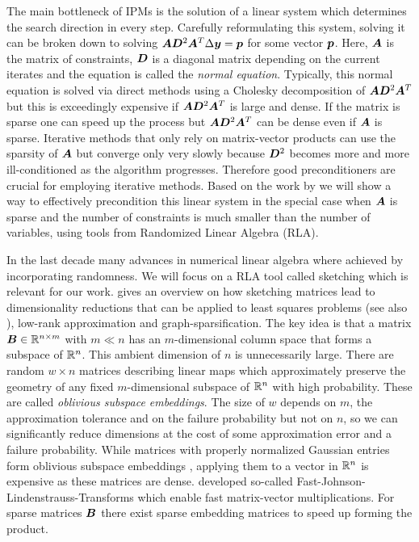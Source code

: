 The main bottleneck of IPMs is the solution of a linear system which determines the search direction in every step.
Carefully reformulating this system, solving it can be broken down to solving \(\bm{A} \bm{D}^2 \bm{A}^T \Delta \bm{y} = \bm{p}\) for some vector \(\bm{p}\).
Here, \(\bm{A}\) is the matrix of constraints, \(\bm{D}\) is a diagonal matrix depending on the current iterates and the equation is called the \emph{normal equation}.
Typically, this normal equation is solved via direct methods using a Cholesky decomposition of \(\bm{A} \bm{D}^2 \bm{A}^T\) \cite[p. 17]{Wright-PrimalDualInteriorPointMethods} but this is exceedingly expensive if \(\bm{A} \bm{D}^2 \bm{A}^T\) is large and dense.
If the matrix is sparse one can speed up the process \cite{NgPeyton-SparseCholesky} but \(\bm{A} \bm{D}^2 \bm{A}^T\) can be dense even if \(\bm{A}\) is sparse.
Iterative methods that only rely on matrix-vector products can use the sparsity of \(\bm{A}\) but converge only very slowly because \(\bm{D}^2\) becomes more and more ill-conditioned as the algorithm progresses.
Therefore good preconditioners are crucial for employing iterative methods.
Based on the work by \textcite{Avron-FasterRandomizedInfeasibleIPMs} we will show a way to effectively precondition this linear system in the special case when \(\bm{A}\) is sparse and the number of constraints is much smaller than the number of variables, using tools from Randomized Linear Algebra (RLA).

In the last decade many advances in numerical linear algebra where achieved by incorporating randomness.
We will focus on a RLA tool called sketching which is relevant for our work.
\textcite{Woodruff-Sketching} gives an overview on how sketching matrices lead to dimensionality reductions that can be applied to least squares problems (see also \cite{Avron-Blendenpik}), low-rank approximation and graph-sparsification.
The key idea is that a matrix \(\bm{B} \in \mathbb{R}^{n \times m}\) with \(m \ll n\) has an \(m\)-dimensional column space that forms a subspace of \(\mathbb{R}^n\).
This ambient dimension of \(n\) is unnecessarily large.
There are random \(w \times n\) matrices describing linear maps which approximately preserve the geometry of any fixed \(m\)-dimensional subspace of \(\mathbb{R}^n\) with high probability.
These are called \emph{oblivious subspace embeddings}.
The size of \(w\) depends on \(m\), the approximation tolerance and on the failure probability but not on \(n\), so we can significantly reduce dimensions at the cost of some approximation error and a failure probability.
While matrices with properly normalized Gaussian entries form oblivious subspace embeddings \cite[Theorem 6]{Woodruff-Sketching}, applying them to a vector in \(\mathbb{R}^n\) is expensive as these matrices are dense.
\textcite{AilonChazelle-FastJohnsonLindenstraussTransform} developed so-called Fast-Johnson-Lindenstrauss-Transforms which enable fast matrix-vector multiplications. For sparse matrices \(\bm{B}\) there exist sparse embedding matrices \cite{Achlioptas-SparseSketching,Cohen-NearlyTightObliviousSubspaceEmbeddings} to speed up forming the product.

